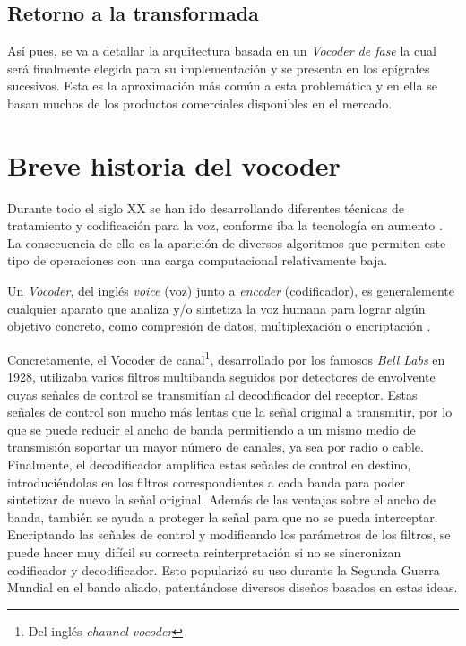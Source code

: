 \subsection{Retorno a la transformada}
Así pues, se va a detallar la arquitectura basada en un \emph{Vocoder de fase} la cual será finalmente elegida para su implementación y se presenta en los epígrafes sucesivos. Esta es la aproximación más común a esta problemática y en ella se basan muchos de los productos comerciales disponibles en el mercado.

\section{Breve historia del vocoder}
Durante todo el siglo XX se han ido desarrollando diferentes técnicas de tratamiento y codificación para la voz, conforme iba la tecnología en aumento \cite{VocHis}. La consecuencia de ello es la aparición de diversos algoritmos que permiten este tipo de operaciones con una carga computacional relativamente baja. 

Un \emph{Vocoder}, del inglés \emph{voice} (voz) junto a \emph{encoder} (codificador), es generalemente cualquier aparato que analiza y/o sintetiza la voz humana para lograr  algún objetivo concreto, como compresión de datos, multiplexación o encriptación \cite{VocOvw}.

Concretamente, el Vocoder de canal\footnote{Del inglés \emph{channel vocoder}}, desarrollado por los famosos \emph{Bell Labs} en 1928, utilizaba varios filtros multibanda seguidos por detectores de envolvente cuyas señales de control se transmitían al decodificador del receptor. Estas señales de control son mucho más lentas que la señal original a transmitir, por lo que se puede reducir el ancho de banda permitiendo a un mismo medio de transmisión soportar un mayor número de canales, ya sea por radio o cable. Finalmente, el decodificador amplifica estas señales de control en destino, introduciéndolas en los filtros correspondientes a cada banda para poder sintetizar de nuevo la señal original. Además de las ventajas sobre el ancho de banda, también se ayuda a proteger la señal para que no se pueda interceptar. Encriptando las señales de control y modificando los parámetros de los filtros, se puede hacer muy difícil su correcta reinterpretación si no se sincronizan codificador y decodificador. Esto popularizó su uso durante la Segunda Guerra Mundial en el bando aliado, patentándose diversos diseños basados en estas ideas.

